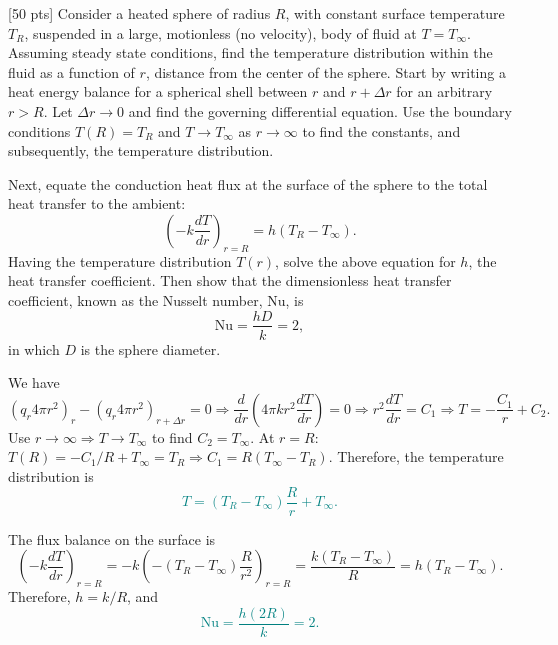 \documentclass[12pt]{article}
\begin{document}
\begin{ex}

  [50 pts] Consider a heated sphere of radius $R$, with constant surface temperature $T_R$, suspended in a large, motionless (no velocity), body of fluid at $T=T_{\infty}$. Assuming steady state conditions, find the temperature distribution within the fluid as a function of $r$, distance from the center of the sphere. Start by writing a heat energy balance for a spherical shell between $r$ and $r+\Delta r$ for an arbitrary $r>R$. Let $\Delta r\to 0$ and find the governing differential equation. Use the boundary conditions $T(R)=T_R$ and $T\to T_{\infty}$ as $r\to\infty$ to find the constants, and subsequently, the temperature distribution.

  Next, equate the conduction heat flux at the surface of the sphere to the total heat transfer to the ambient:
  $$\left(-k\frac{dT}{dr}\right)_{r=R}=h(T_{R}-T_{\infty}).$$
  Having the temperature distribution $T(r)$, solve the above equation for $h$, the heat transfer coefficient. Then show that the dimensionless heat transfer coefficient, known as the Nusselt number, $\mathrm{Nu}$, is
  $$\mathrm{Nu}=\frac{hD}{k}=2,$$
  in which $D$ is the sphere diameter.
\end{ex}

\begin{solution}
  We have
  $$\left(q_r 4\pi r^2\right)_r-\left(q_r 4\pi r^2\right)_{r+\Delta r}=0\Rightarrow\frac{d}{dr}\left(4\pi kr^2\frac{dT}{dr}\right)=0\Rightarrow r^2\frac{dT}{dr}=C_1\Rightarrow T=-\frac{C_1}{r}+C_2.$$
  Use $r\to\infty\Rightarrow T\to T_{\infty}$ to find $C_2=T_{\infty}$. At $r=R$: $T(R)=-C_1/R+T_{\infty}=T_R\Rightarrow C_1=R(T_{\infty}-T_R)$. Therefore, the temperature distribution is\textcolor{teal}{
    $$T=(T_R-T_{\infty})\frac{R}{r}+T_{\infty}.$$}%

  The flux balance on the surface is
  $$\left(-k\frac{dT}{dr}\right)_{r=R}=-k\left(-(T_R-T_{\infty})\frac{R}{r^2}\right)_{r=R}=\frac{k(T_R-T_{\infty})}{R}=h(T_R-T_{\infty}).$$
  Therefore, $h=k/R$, and\textcolor{teal}{
  $$\mathrm{Nu}=\frac{h(2R)}{k}=2.$$}
\end{solution}
\end{document}
